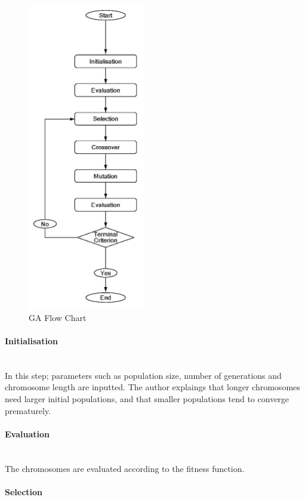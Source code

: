 \begin{figure}[htbp]
\centering
\includegraphics[height=13.5cm]{./Images/24-GoGALoop}
\caption[GA Flow Chart]{GA Flow Chart \cite{kawakita08}}
\label{fig:GoGAFC}
\end{figure}

\paragraph{Initialisation}\mbox{} \\

In this step; parameters such as population size, number of generations and chromosome length are inputted. The author explaings that longer chromosomes need larger initial populations, and that smaller populations tend to converge prematurely.

\paragraph{Evaluation}\mbox{}\\

The chromosomes are evaluated according to the fitness function.

\paragraph{Selection}\mbox{}\\

